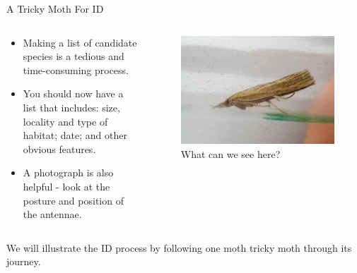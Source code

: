 \documentclass[
  ignorenonframetext,
]{beamer}
\providecommand{\tightlist}{%
  \setlength{\itemsep}{0pt}\setlength{\parskip}{0pt}}
\begin{document}
\begin{frame}{A Tricky Moth For ID}
\protect\hypertarget{a-tricky-moth-for-id}{}
\begin{columns}[T]
\begin{column}{0.5\textwidth}
\begin{itemize}
\tightlist
\item
  Making a list of candidate species is a tedious and time-consuming
  process.
\item
  You should now have a list that includes: size, locality and type of
  habitat; date; and other obvious features.
\item
  A photograph is also helpful - look at the posture and position of the
  antennae.
\end{itemize}
\end{column}

\begin{column}{0.5\textwidth}
\begin{figure}
\centering
\includegraphics{./images/Pcontaminella-PML-2021.jpg}
\caption{What can we see here?}
\end{figure}
\end{column}
\end{columns}

We will illustrate the ID process by following one moth tricky moth
through its journey.
\end{frame}
\end{document}

